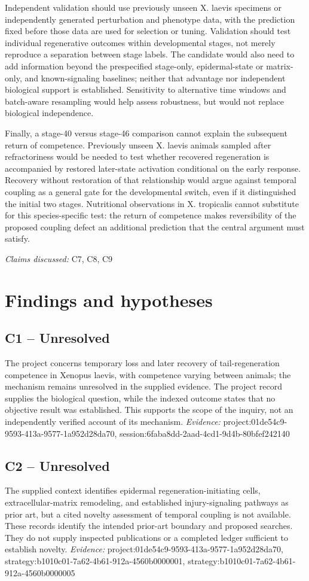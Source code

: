 \documentclass[11pt]{article}
\begin{document}
Independent validation should use previously unseen X. laevis specimens or independently generated perturbation and phenotype data, with the prediction fixed before those data are used for selection or tuning. Validation should test individual regenerative outcomes within developmental stages, not merely reproduce a separation between stage labels. The candidate would also need to add information beyond the prespecified stage-only, epidermal-state or matrix-only, and known-signaling baselines; neither that advantage nor independent biological support is established. Sensitivity to alternative time windows and batch-aware resampling would help assess robustness, but would not replace biological independence.

Finally, a stage-40 versus stage-46 comparison cannot explain the subsequent return of competence. Previously unseen X. laevis animals sampled after refractoriness would be needed to test whether recovered regeneration is accompanied by restored later-state activation conditional on the early response. Recovery without restoration of that relationship would argue against temporal coupling as a general gate for the developmental switch, even if it distinguished the initial two stages. Nutritional observations in X. tropicalis cannot substitute for this species-specific test: the return of competence makes reversibility of the proposed coupling defect an additional prediction that the central argument must satisfy.

\textit{Claims discussed: }C7, C8, C9
\section{Findings and hypotheses}
\subsection{C1 -- Unresolved}
The project concerns temporary loss and later recovery of tail-regeneration competence in Xenopus laevis, with competence varying between animals; the mechanism remains unresolved in the supplied evidence.
The project record supplies the biological question, while the indexed outcome states that no objective result was established. This supports the scope of the inquiry, not an independently verified account of its mechanism.
\textit{Evidence: }project:01de54c9-9593-413a-9577-1a952d28da70, session:6faba8dd-2aad-4cd1-9d4b-80bfef242140
\subsection{C2 -- Unresolved}
The supplied context identifies epidermal regeneration-initiating cells, extracellular-matrix remodeling, and established injury-signaling pathways as prior art, but a cited novelty assessment of temporal coupling is not available.
These records identify the intended prior-art boundary and proposed searches. They do not supply inspected publications or a completed ledger sufficient to establish novelty.
\textit{Evidence: }project:01de54c9-9593-413a-9577-1a952d28da70, strategy:b1010c01-7a62-4b61-912a-4560b0000001, strategy:b1010c01-7a62-4b61-912a-4560b0000005
\end{document}

